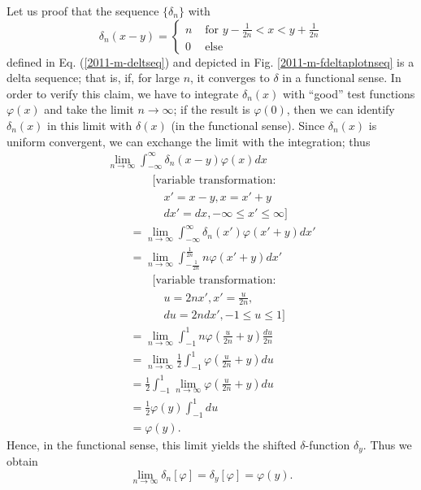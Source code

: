 {Let us proof that the sequence $\{ \delta_n\}$ with
$$\delta_n(x-y) =
\left\{
\begin{array}{rl}
n & \textrm{ for } y - \frac{1}{2n}  < x < y+ \frac{1}{2n} \\
0& \textrm{ else }
\end{array}
\right.$$
defined in Eq. (\ref{2011-m-deltseq}) and depicted
in Fig.
\ref{2011-m-fdeltaplotnseq}
is a delta sequence;
that is, if, for large $n$, it converges to $\delta$ in a functional sense.
In order to verify this claim, we have to integrate $\delta_n(x)$
with ``good'' test functions $ \varphi (x)$ and take the limit $n\rightarrow \infty$;
if the result is $ \varphi (0)$, then we can identify $\delta_n(x)$ in this limit with $\delta (x)$
(in the functional sense).
Since $\delta_n(x)$ is uniform convergent, we can exchange the limit with the integration; thus
\begin{equation}
\begin{split}
\lim_{n\rightarrow \infty} \int_{-\infty}^\infty \delta_n(x-y) \varphi (x) dx \\
\qquad\qquad\textrm{[variable transformation:}  \\
\qquad\qquad\quad  x'=x-y, x= x'+y   \\
\qquad\qquad\quad  dx' =  dx, -\infty\le x' \le \infty \textrm{]} \\
\qquad =
\lim_{n\rightarrow \infty} \int_{-\infty}^\infty \delta_n(x') \varphi (x'+y) dx' \\
\qquad =
\lim_{n\rightarrow \infty} \int_{- \frac{1}{2n}}^\frac{1}{2n} n \varphi (x'+y) dx'    \\
\qquad\qquad\textrm{[variable transformation:}  \\
\qquad\qquad\quad  u=2nx', x'=\frac{u}{2n},    \\
\qquad\qquad\quad  du = 2n dx', -1\le u \le 1\textrm{]} \\
\qquad = \lim_{n\rightarrow \infty} \int_{- 1}^1 n \varphi (\frac{ u}{2n}+y) \frac{du}{2n}       \\
\qquad =
\lim_{n\rightarrow \infty} \frac{1}{2} \int_{- 1}^1 \varphi (\frac{ u}{2n}+y) du     \\
\qquad =
\frac{1}{2} \int_{- 1}^1 \lim_{n\rightarrow \infty} \varphi (\frac{ u}{2n}+y) du    \\
\qquad =
\frac{1}{2} \varphi (y) \int_{- 1}^1  du     \\
\qquad =
\varphi (y)
.
\end{split}
\end{equation}
Hence, in the functional sense,
this limit yields the shifted $\delta$-function $\delta_y$.
Thus we obtain
$$
\lim_{n\rightarrow \infty} \delta_n[\varphi] = \delta_y [\varphi] = \varphi (y).
$$
\eexample
}




